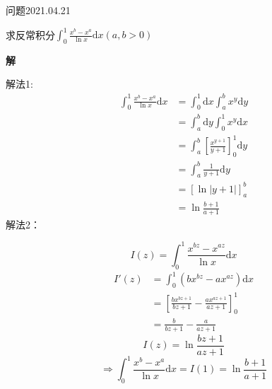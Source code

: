 \begin{mybox}{问题2021.04.21}
	
	\qquad 求反常积分$\int_{0}^{1}\frac{x^b-x^a}{\ln x}\mathrm{d}x(a,b>0)$
\end{mybox}
\noindent
\textbf{解}

\noindent
解法1:
\begin{align*}
	\int_{0}^{1}\frac{x^b-x^a}{\ln x}\mathrm{d}x&=\int_{0}^{1}\mathrm{d}x\int_{a}^{b}x^y\mathrm{d}y\\
	&=\int_{a}^{b}\mathrm{d}y\int_{0}^{1}x^y\mathrm{d}x\\
	&=\int_{a}^{b}[\frac{x^{y+1}}{y+1}]_{0}^{1}\mathrm{d}y\\
	&=\int_{a}^{b}\frac{1}{y+1}\mathrm{d}y\\
	&=[\ln\left|y+1\right|]_{a}^{b}\\
	&=\ln\frac{b+1}{a+1}
\end{align*}
\noindent
解法2：

$$I(z)=\int_{0}^{1} \frac{x^{bz}-x^{az}}{\ln x}\mathrm{d}x$$
\begin{align*}
	I'(z)&=\int_{0}^{1} (bx^{bz}-ax^{az})\mathrm{d}x\\
	     &=[\frac{bx^{bz+1}}{bz+1}-\frac{ax^{az+1}}{az+1}]_{0}^{1}\\
	     &=\frac{b}{bz+1}-\frac{a}{az+1}
\end{align*}
$$I(z)=\ln \frac{bz+1}{az+1}$$
$$\Rightarrow \int_{0}^{1}\frac{x^b-x^a}{\ln x}\mathrm{d}x =I(1)=\ln\frac{b+1}{a+1} $$